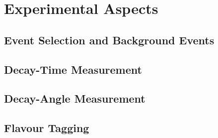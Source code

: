 \chapter{Experimental Aspects}
\label{chap:exp}

\section{Event Selection and Background Events}
\label{sec:exp_selBkg}
\section{Decay-Time Measurement}
\label{sec:exp_time}
\section{Decay-Angle Measurement}
\label{sec:exp_angles}
\section{Flavour Tagging}
\label{sec:exp_tagging}
